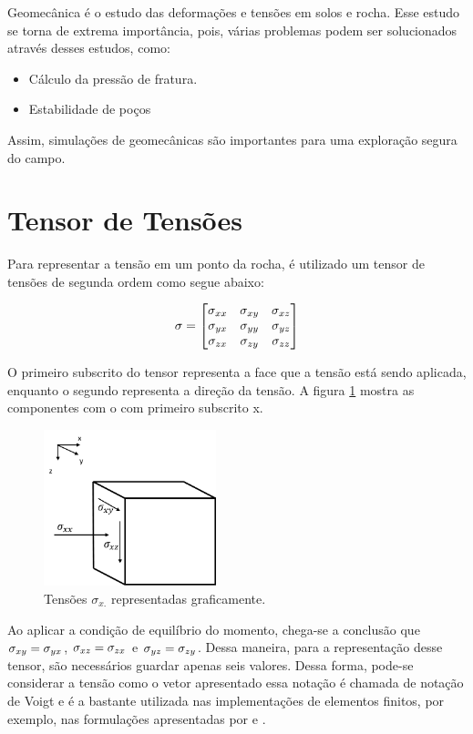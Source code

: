 


Geomecânica é o estudo das deformações e tensões em solos e rocha. Esse estudo se torna de extrema importância, pois, várias problemas podem ser solucionados através desses estudos, como:
\begin{itemize}
    \item Cálculo da pressão de fratura.
    \item Estabilidade de poços
\end{itemize}

Assim, simulações de geomecânicas são importantes para uma exploração segura do campo.

\section{Tensor de Tensões}

Para representar a tensão em um ponto da rocha, é utilizado um tensor de tensões de segunda ordem como segue abaixo:

\begin{equation}
\mathbf{\sigma} =
    \begin{bmatrix}
    \sigma_{xx} & \sigma_{xy} & \sigma_{xz} \\
    \sigma_{yx} & \sigma_{yy} & \sigma_{yz} \\
    \sigma_{zx} & \sigma_{zy} & \sigma_{zz}
    \end{bmatrix}
\end{equation}

O primeiro subscrito do tensor representa a face que a tensão está sendo aplicada, enquanto o segundo representa a direção da tensão. A figura \ref{fig:tensoesx} mostra as componentes com o com primeiro subscrito x.


\begin{figure}[!htbp]
\centering
\includegraphics[width=5cm]{chap01/tensor.png}
\caption{Tensões $\sigma_{x.}$ representadas graficamente.}
\label{fig:tensoesx}
\end{figure}

Ao aplicar a condição de equilíbrio do momento, chega-se a conclusão que $\sigma_{xy}=\sigma_{yx}$, $\sigma_{xz}=\sigma_{zx}$ e $\sigma_{yz}=\sigma_{zy}$. Dessa maneira, para a representação desse tensor, são necessários guardar apenas seis valores. Dessa forma, pode-se considerar a tensão como o vetor apresentado \label{eq:tensor6} essa notação é chamada de notação de Voigt e é a bastante utilizada nas implementações de elementos finitos, por exemplo, nas formulações apresentadas por \cite{hughes} e \cite{jacob}.


